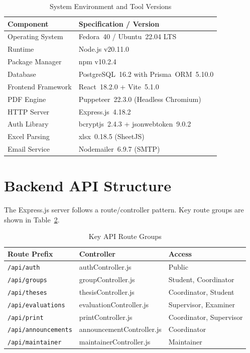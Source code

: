 \documentclass[12pt]{report}
\begin{document}
\begin{table}[H]
\centering
\caption{System Environment and Tool Versions}
\label{tab:env_config}
\begin{tabular}{l l}
\toprule
\textbf{Component} & \textbf{Specification / Version}\\
\midrule
Operating System   & Fedora~40 / Ubuntu~22.04 LTS\\
Runtime            & Node.js v20.11.0\\
Package Manager    & npm v10.2.4\\
Database           & PostgreSQL~16.2 with Prisma~ORM~5.10.0\\
Frontend Framework & React~18.2.0 + Vite~5.1.0\\
PDF Engine         & Puppeteer~22.3.0 (Headless Chromium)\\
HTTP Server        & Express.js~4.18.2\\
Auth Library       & bcryptjs~2.4.3 + jsonwebtoken~9.0.2\\
Excel Parsing      & xlsx~0.18.5 (SheetJS)\\
Email Service      & Nodemailer~6.9.7 (SMTP)\\
\bottomrule
\end{tabular}
\end{table}

\section{Backend API Structure}
The Express.js server follows a route/controller pattern. Key route groups are shown in
Table~\ref{tab:api_routes}.

\begin{table}[H]
\centering
\caption{Key API Route Groups}
\label{tab:api_routes}
\begin{tabular}{l l l}
\toprule
\textbf{Route Prefix} & \textbf{Controller} & \textbf{Access}\\
\midrule
\texttt{/api/auth}           & authController.js          & Public\\
\texttt{/api/groups}         & groupController.js         & Student, Coordinator\\
\texttt{/api/theses}         & thesisController.js        & Coordinator, Student\\
\texttt{/api/evaluations}    & evaluationController.js    & Supervisor, Examiner\\
\texttt{/api/print}          & printController.js         & Coordinator, Supervisor\\
\texttt{/api/announcements}  & announcementController.js  & Coordinator\\
\texttt{/api/maintainer}     & maintainerController.js    & Maintainer\\
\bottomrule
\end{tabular}
\end{table}
\end{document}
